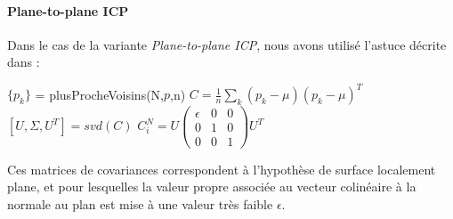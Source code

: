 \paragraph{Plane-to-plane ICP}

Dans le cas de la variante \textit{Plane-to-plane ICP}, nous avons utilisé l'astuce décrite dans \cite{bib_gicp} : \\


\begin{algorithm}[H]
$\{p_{k}\}$ = plusProcheVoisins(N,$p$,n)\;
$C = \frac{1}{n}\sum_{k}{(p_{k}-\mu)(p_{k}-\mu)^{T}}$\;
$[U,\Sigma,U^{T}] = svd(C)$\;
$C_{i}^{N} = U\begin{pmatrix}
\epsilon & 0 & 0\\
0 & 1 & 0\\
0 & 0 & 1
\end{pmatrix}U^{T}$
\end{algorithm}

Ces matrices de covariances correspondent à l'hypothèse de surface localement plane, et pour lesquelles la valeur propre associée au vecteur colinéaire à la normale au plan est mise à une valeur très faible $\epsilon$.